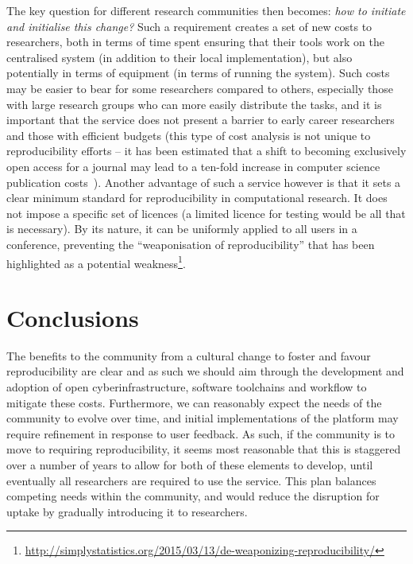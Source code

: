 \documentclass[conference]{IEEEtran}
\begin{document}
The key question for different research communities then becomes:
{\emph{how to initiate and initialise this change?}} Such a
requirement creates a set of new costs to researchers, both in terms
of time spent ensuring that their tools work on the centralised system
(in addition to their local implementation), but also potentially in
terms of equipment (in terms of running the system). Such costs may be
easier to bear for some researchers compared to others, especially those
with large research groups who can more easily distribute the tasks,
and it is important that the service does not present a barrier to
early career researchers and those with efficient budgets (this type
of cost analysis is not unique to reproducibility efforts -- it has
been estimated that a shift to becoming exclusively open access for a
journal may lead to a ten-fold increase in computer science
publication costs~\cite{vardi-cacm-2014}). Another advantage of such a
service however is that it sets a clear minimum standard for
reproducibility in computational research. It does not impose a specific set
of licences (a limited licence for testing would be all that is
necessary). By its nature, it can be uniformly applied to all users in
a conference, preventing the ``weaponisation of reproducibility'' that
has been highlighted as a potential
weakness\footnote{\url{http://simplystatistics.org/2015/03/13/de-weaponizing-reproducibility/}}.


\section{Conclusions}\label{concl}

The benefits to the community from a cultural change to foster and
favour reproducibility are clear and as such we should aim through the
development and adoption of open cyberinfrastructure, software
toolchains and workflow to mitigate these costs. Furthermore, we can
reasonably expect the needs of the community to evolve over time, and
initial implementations of the platform may require refinement in
response to user feedback. As such, if the community is to move to
requiring reproducibility, it seems most reasonable that this is
staggered over a number of years to allow for both of these elements
to develop, until eventually all researchers are required to use the
service. This plan balances competing needs within the community, and
would reduce the disruption for uptake by gradually introducing it to
researchers.
\end{document}
